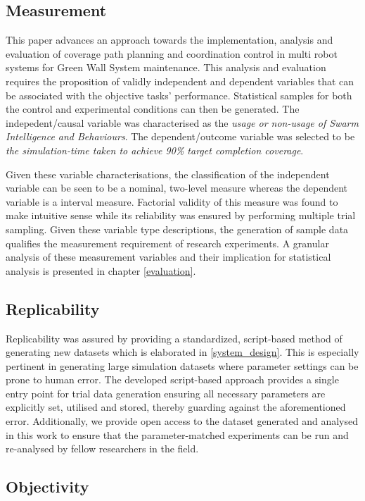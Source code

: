 \documentclass{report}
\begin{document}
\subsection{Measurement}

This paper advances an approach towards the implementation, analysis and evaluation of coverage path planning and coordination control in multi robot systems for Green Wall System maintenance. This analysis and evaluation requires the proposition of validly independent and dependent variables that can be associated with the objective tasks' performance. Statistical samples for both the control and experimental conditions can then be generated. The indepedent/causal variable was characterised as the \textit{usage or non-usage of Swarm Intelligence and Behaviours}. The dependent/outcome variable was selected to be \textit{the simulation-time taken to achieve 90\% target completion coverage}.

Given these variable characterisations, the classification of the independent variable can be seen to be a nominal, two-level measure whereas the dependent variable is a interval measure. Factorial validity of this measure was found to make intuitive sense \cite{Field2012} while its reliability was ensured by performing multiple trial sampling. Given these variable type descriptions, the generation of sample data qualifies the measurement requirement of research experiments. A granular analysis of these measurement variables and their implication for statistical analysis is presented in chapter \ref{evaluation}.

\subsection{Replicability}

Replicability was assured by providing a standardized, script-based method of generating new datasets which is elaborated in \ref{system_design}. This is especially pertinent in generating large simulation datasets where parameter settings can be prone to human error. The developed script-based approach provides a single entry point for trial data generation ensuring all necessary parameters are explicitly set, utilised and stored, thereby guarding against the aforementioned error. Additionally, we provide open access to the dataset generated and analysed in this work to ensure that the parameter-matched experiments can be run and re-analysed by fellow researchers in the field.

\subsection{Objectivity}
\end{document}
